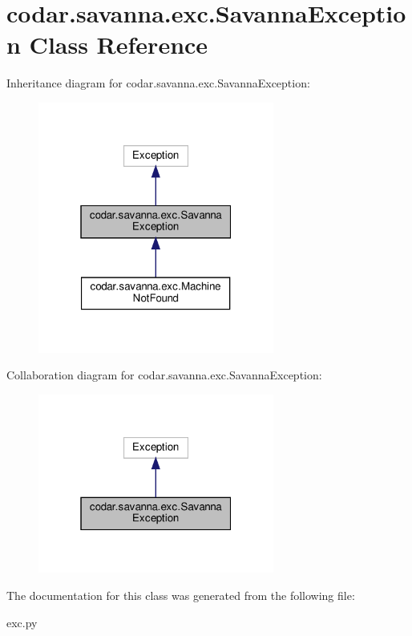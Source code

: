 \hypertarget{classcodar_1_1savanna_1_1exc_1_1_savanna_exception}{}\section{codar.\+savanna.\+exc.\+Savanna\+Exception Class Reference}
\label{classcodar_1_1savanna_1_1exc_1_1_savanna_exception}


Inheritance diagram for codar.\+savanna.\+exc.\+Savanna\+Exception\+:
\nopagebreak
\begin{figure}[H]
\begin{center}
\leavevmode
\includegraphics[width=220pt]{classcodar_1_1savanna_1_1exc_1_1_savanna_exception__inherit__graph}
\end{center}
\end{figure}


Collaboration diagram for codar.\+savanna.\+exc.\+Savanna\+Exception\+:
\nopagebreak
\begin{figure}[H]
\begin{center}
\leavevmode
\includegraphics[width=220pt]{classcodar_1_1savanna_1_1exc_1_1_savanna_exception__coll__graph}
\end{center}
\end{figure}


The documentation for this class was generated from the following file\+:\begin{DoxyCompactItemize}
\item 
exc.\+py\end{DoxyCompactItemize}

